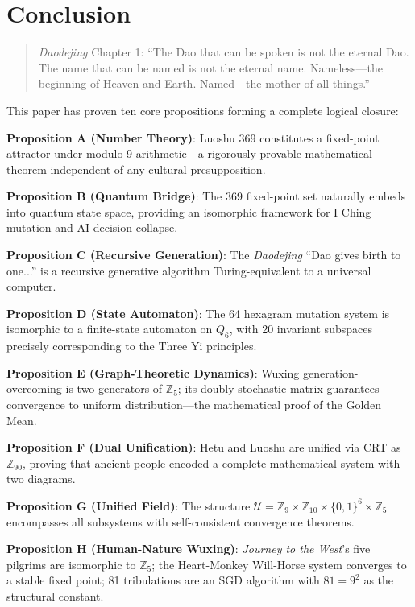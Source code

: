 \documentclass[conference]{IEEEtran}
\theoremstyle{remark}
\newcommand{\Z}{\mathbb{Z}}
\newcommand{\U}{\mathcal{U}}
\begin{document}
\section{Conclusion}

\begin{quote}
\emph{Daodejing} Chapter 1: ``The Dao that can be spoken is not the eternal Dao. The name that can be named is not the eternal name. Nameless---the beginning of Heaven and Earth. Named---the mother of all things.''
\end{quote}

This paper has proven ten core propositions forming a complete logical closure:

\textbf{Proposition A (Number Theory)}: Luoshu 369 constitutes a fixed-point attractor under modulo-9 arithmetic---a rigorously provable mathematical theorem independent of any cultural presupposition.

\textbf{Proposition B (Quantum Bridge)}: The 369 fixed-point set naturally embeds into quantum state space, providing an isomorphic framework for I Ching mutation and AI decision collapse.

\textbf{Proposition C (Recursive Generation)}: The \emph{Daodejing} ``Dao gives birth to one...'' is a recursive generative algorithm Turing-equivalent to a universal computer.

\textbf{Proposition D (State Automaton)}: The 64 hexagram mutation system is isomorphic to a finite-state automaton on $Q_6$, with 20 invariant subspaces precisely corresponding to the Three Yi principles.

\textbf{Proposition E (Graph-Theoretic Dynamics)}: Wuxing generation-overcoming is two generators of $\Z_5$; its doubly stochastic matrix guarantees convergence to uniform distribution---the mathematical proof of the Golden Mean.

\textbf{Proposition F (Dual Unification)}: Hetu and Luoshu are unified via CRT as $\Z_{90}$, proving that ancient people encoded a complete mathematical system with two diagrams.

\textbf{Proposition G (Unified Field)}: The structure $\U=\Z_9\times\Z_{10}\times\{0,1\}^6\times\Z_5$ encompasses all subsystems with self-consistent convergence theorems.

\textbf{Proposition H (Human-Nature Wuxing)}: \emph{Journey to the West}'s five pilgrims are isomorphic to $\Z_5$; the Heart-Monkey Will-Horse system converges to a stable fixed point; 81 tribulations are an SGD algorithm with $81=9^2$ as the structural constant.
\end{document}
